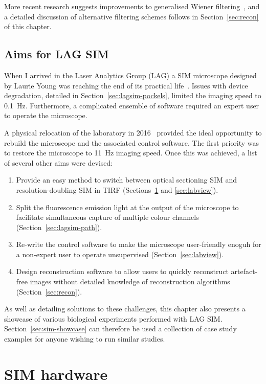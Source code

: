 More recent research suggests improvements to generalised Wiener filtering~\cite{righolt2013image, perez2016optimal, chakrova2016deconvolution}, and a detailed discussion of alternative filtering schemes follows in Section~\ref{sec:recon} of this chapter. 


\subsection{Aims for LAG SIM}
When I arrived in the Laser Analytics Group (LAG) a SIM microscope designed by Laurie Young was reaching the end of its practical life~\cite{young2016guide}.
Issues with device degradation, detailed in Section~\ref{sec:lagsim-pockels}, limited the imaging speed to \SI{0.1}{\hertz}.
Furthermore, a complicated ensemble of software required an expert user to operate the microscope.

A physical relocation of the laboratory in 2016~\cite{newbuilding} provided the ideal opportunity to rebuild the microscope and the associated control software. The first priority was to restore the microscope to \SI{11}{\hertz} imaging speed. Once this was achieved, a list of several other aims were devised: 
\begin{enumerate}
	\item Provide an easy method to switch between optical sectioning SIM and resolution-doubling SIM in TIRF (Sections~\ref{sec:hardware} and \ref{sec:labview}). 
	\item Split the fluorescence emission light at the output of the microscope to facilitate simultaneous capture of multiple colour channels (Section~\ref{sec:lagsim-path}). 
	\item Re-write the control software to make the microscope user-friendly enoguh for a non-expert user to operate unsupervised (Section~\ref{sec:labview}).
	\item Design reconstruction software to allow users to quickly reconstruct artefact-free images without detailed knowledge of reconstruction algorithms (Section~\ref{sec:recon}). 
\end{enumerate}

As well as detailing solutions to these challenges, this chapter also presents a showcase of various biological experiments performed with LAG SIM. 
Section~\ref{sec:sim-showcase} can therefore be used a collection of case study examples for anyone wishing to run similar studies. 

\section{SIM hardware} \label{sec:hardware}
